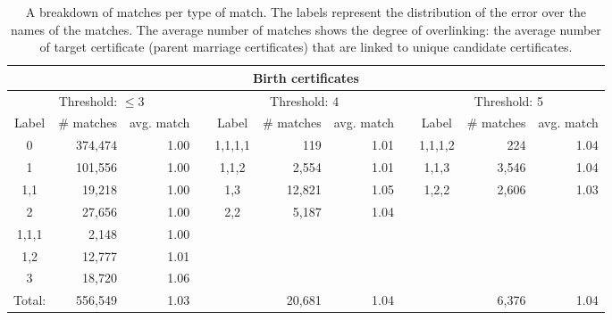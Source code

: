 \begin{table}
	\begin{center}
	\caption[Breakdown of all matches]{\label{tab:breakdown_birth_matches} A breakdown of matches per type of match. The labels represent the distribution of the error over the names of the matches. The average number of matches shows the degree of overlinking: the average number of target certificate (parent marriage certificates) that are linked to unique candidate certificates.}
	\vspace{0.5cm}
	\hspace*{-1.85cm}
	\resizebox{\columnwidth}{!} {
		\begin{tabular}{*{2}{crrr}crr}
			\toprule
			\multicolumn{11}{c}{Birth certificates}\\
			\toprule
			\multicolumn{3}{c}{Threshold: $\leq$3} & & \multicolumn{3}{c}{Threshold: 4} & & \multicolumn{3}{c}{Threshold: 5}\\
			Label & \# matches & avg. match & & Label & \# matches & avg. match & & Label & \# matches & avg. match \\
			\cmidrule{1-3} \cmidrule{5-7} \cmidrule{9-11} 
			0 		& 374,474 & 1.00 && 1,1,1,1 & 119 		& 1.01	&& 1,1,1,2 	& 224 		& 1.04\\
			1 		& 101,556 &	1.00 && 1,1,2   & 2,554		& 1.01 	&& 1,1,3 	& 3,546 	& 1.04\\
			1,1 	& 19,218  &	1.00 && 1,3 	& 12,821	& 1.05 	&& 1,2,2 	& 2,606  	& 1.03\\
			2 		& 27,656  &	1.00 && 2,2 	& 5,187		& 1.04 	&&  		&   		&\\
			1,1,1 	& 2,148   &	1.00 &&		   	&			&		&&			&			&\\
			1,2 	& 12,777  &	1.01 &&		   	&			&		&&			&			&\\
			3 		& 18,720  &	1.06 &&		   	&			&		&&			&			&\\
			\midrule
			Total: 	& 556,549 &	1.03 && 		& 20,681 	& 1.04	&&			& 6,376		& 1.04\\
			\bottomrule
		\end{tabular}
	}
		\hspace*{-1.85cm}


\end{center}
\end{table}
